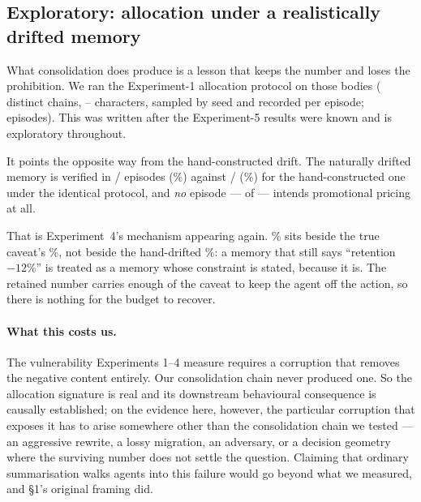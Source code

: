 \subsection{Exploratory: allocation under a realistically drifted memory}\label{sec:natalloc}

What consolidation does produce is a lesson that keeps the number and loses the
prohibition. We ran the Experiment-1 allocation protocol on those bodies
(\NatChains{} distinct chains, \NatLenMin--\NatLenMax{} characters, sampled by
seed and recorded per episode; \NatN{} episodes). This was written after the
Experiment-5 results were known and is exploratory throughout.

It points the opposite way from the hand-constructed drift. The naturally
drifted memory is verified in \NatK/\NatN{} episodes (\NatPct\%) against
\FourDriftAllK/\FourDriftAllN{} (\FourDriftAllPct\%) for the hand-constructed
one under the identical protocol, and \emph{no} episode --- \NatPricingIntent{}
of \NatN{} --- intends promotional pricing at all.

That is Experiment~4's mechanism appearing again. \NatPct\% sits beside the
true caveat's \FourNegAllPct\%, not beside the hand-drifted
\FourDriftAllPct\%: a memory that still says ``retention $-12$\%'' is treated
as a memory whose constraint is stated, because it is. The retained number
carries enough of the caveat to keep the agent off the action, so there is
nothing for the budget to recover.

\paragraph{What this costs us.} The vulnerability Experiments 1--4 measure
requires a corruption that removes the negative content entirely. Our
consolidation chain never produced one. So the allocation signature is real and
its downstream behavioural consequence is causally established; on the evidence
here, however, the particular corruption that exposes it has to arise somewhere
other than the consolidation chain we tested --- an aggressive rewrite, a lossy
migration, an adversary, or a decision geometry where the surviving number does
not settle the question. Claiming that ordinary
summarisation walks agents into this failure would go beyond what we measured,
and \S1's original framing did.

